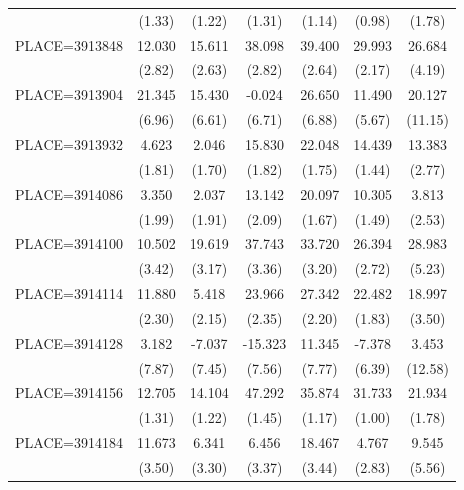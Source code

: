 {\begin{tabular}{l*{6}{c}}
                    &      (1.33)&      (1.22)&      (1.31)&      (1.14)&      (0.98)&      (1.78)\\
PLACE=3913848       &      12.030&      15.611&      38.098&      39.400&      29.993&      26.684\\
                    &      (2.82)&      (2.63)&      (2.82)&      (2.64)&      (2.17)&      (4.19)\\
PLACE=3913904       &      21.345&      15.430&      -0.024&      26.650&      11.490&      20.127\\
                    &      (6.96)&      (6.61)&      (6.71)&      (6.88)&      (5.67)&     (11.15)\\
PLACE=3913932       &       4.623&       2.046&      15.830&      22.048&      14.439&      13.383\\
                    &      (1.81)&      (1.70)&      (1.82)&      (1.75)&      (1.44)&      (2.77)\\
PLACE=3914086       &       3.350&       2.037&      13.142&      20.097&      10.305&       3.813\\
                    &      (1.99)&      (1.91)&      (2.09)&      (1.67)&      (1.49)&      (2.53)\\
PLACE=3914100       &      10.502&      19.619&      37.743&      33.720&      26.394&      28.983\\
                    &      (3.42)&      (3.17)&      (3.36)&      (3.20)&      (2.72)&      (5.23)\\
PLACE=3914114       &      11.880&       5.418&      23.966&      27.342&      22.482&      18.997\\
                    &      (2.30)&      (2.15)&      (2.35)&      (2.20)&      (1.83)&      (3.50)\\
PLACE=3914128       &       3.182&      -7.037&     -15.323&      11.345&      -7.378&       3.453\\
                    &      (7.87)&      (7.45)&      (7.56)&      (7.77)&      (6.39)&     (12.58)\\
PLACE=3914156       &      12.705&      14.104&      47.292&      35.874&      31.733&      21.934\\
                    &      (1.31)&      (1.22)&      (1.45)&      (1.17)&      (1.00)&      (1.78)\\
PLACE=3914184       &      11.673&       6.341&       6.456&      18.467&       4.767&       9.545\\
                    &      (3.50)&      (3.30)&      (3.37)&      (3.44)&      (2.83)&      (5.56)\\

\end{tabular}}
